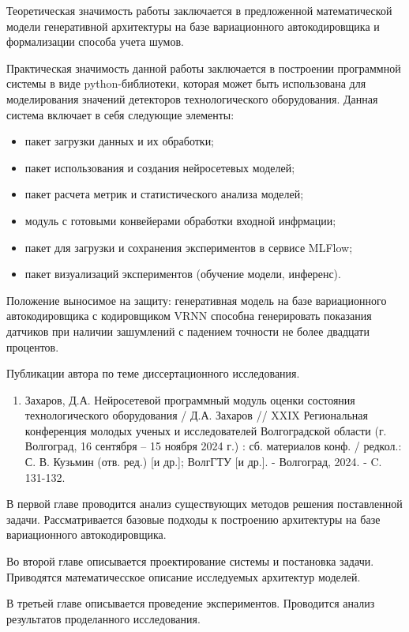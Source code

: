 \documentclass[14pt, a4paper, oneside]{extreport}
\begin{document}
Теоретическая значимость работы заключается в предложенной математической модели генеративной архитектуры на базе вариационного автокодировщика и формализации способа учета шумов.

Практическая значимость данной работы заключается в построении программной системы в виде python-библиотеки, которая может быть использована для моделирования значений детекторов технологического оборудования. Данная система включает в себя следующие элементы:
\begin{itemize}
    \item пакет загрузки данных и их обработки;
    \item пакет использования и создания нейросетевых моделей;
    \item пакет расчета метрик и статистического анализа моделей;
    \item модуль с готовыми конвейерами обработки входной инфрмации;
    \item пакет для загрузки и сохранения экспериментов в сервисе MLFlow;
    \item пакет визуализаций экспериментов (обучение модели, инференс).
\end{itemize}

Положение выносимое на защиту: генеративная модель на базе вариационного автокодировщика с кодировщиком VRNN способна генерировать показания датчиков при наличии зашумлений с падением точности не более двадцати процентов.

Публикации автора по теме диссертационного исследования. 
\begin{enumerate}
    \item Захаров, Д.А. Нейросетевой программный модуль оценки состояния технологического оборудования / Д.А. Захаров // XXIX Региональная конференция молодых ученых и исследователей Волгоградской области (г. Волгоград, 16 сентября – 15 ноября 2024 г.) : сб. материалов конф. / редкол.: С. В. Кузьмин (отв. ред.) [и др.]; ВолгГТУ [и др.]. - Волгоград, 2024. - C. 131-132.

\end{enumerate}

В первой главе проводится анализ существующих методов решения поставленной задачи. Рассматривается базовые подходы к построению архитектуры на базе вариационного автокодировщика.

Во второй главе описывается проектирование системы и постановка задачи. Приводятся математичесское описание исследуемых архитектур моделей.

В третьей главе описывается проведение экспериментов. Проводится анализ результатов проделанного исследования.
\end{document}
